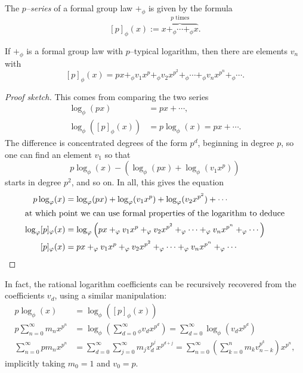 \begin{definition}
The \textit{$p$--series} of a formal group law $+_\phi$ is given by the formula \[[p]_\phi(x) := \overset{\text{$p$ times}}{\overbrace{x +_\phi \cdots +_\phi x}}.\]
\end{definition}

\begin{lemma}
If $+_\phi$ is a formal group law with $p$--typical logarithm, then there are elements $v_n$ with \[[p]_\phi(x) = px +_\phi v_1 x^p +_\phi v_2 x^{p^2} +_\phi \cdots +_\phi v_n x^{p^n} +_\phi \cdots.\]
\end{lemma}
\begin{proof}[Proof sketch]
This comes from comparing the two series
\begin{align*}
\log_\phi(px) & = px + \cdots, \\
\log_\phi([p]_\phi(x)) & = p \log_\phi(x) = px + \cdots.
\end{align*}
The difference is concentrated degrees of the form $p^d$, beginning in degree $p$, so one can find an element $v_1$ so that \[p \log_\phi(x) - (\log_\phi(px) + \log_\phi(v_1 x^p))\] starts in degree $p^2$, and so on.  In all, this gives the equation
\begin{align*}
p \log_\phi(x) & = \log_\phi (px) + \log_\phi(v_1 x^p) + \log_\phi(v_2 x^{p^2}) + \cdots \\
\intertext{at which point we can use formal properties of the logarithm to deduce}
\log_\phi [p]_\phi(x) & = \log_\phi \left(px +_\phi v_1 x^p +_\phi v_2 x^{p^2} +_\phi \cdots +_\phi v_n x^{p^n} +_\phi \cdots\right) \\
[p]_\phi(x) & = px +_\phi v_1 x^p +_\phi v_2 x^{p^2} +_\phi \cdots +_\phi v_n x^{p^n} +_\phi \cdots \qedhere
\end{align*}
\end{proof}

\begin{remark}
In fact, the rational logarithm coefficients can be recursively recovered from the coefficients $v_d$, using a similar manipulation:
\begin{align*}
p \log_\phi(x) & = \log_\phi\left([p]_\phi(x)\right) \\
p \sum_{n=0}^\infty m_n x^{p^n} & = \log_\phi \left(\sum_{d=0}^\infty{}_\phi v_d x^{p^d} \right) = \sum_{d=0}^\infty \log_\phi\left(v_d x^{p^d}\right) \\
\sum_{n=0}^\infty p m_n x^{p^n} & = \sum_{d=0}^\infty \sum_{j=0}^\infty m_j v_d^{p^j} x^{p^{d+j}} = \sum_{n=0}^\infty \left( \sum_{k=0}^n m_k v_{n-k}^{p^k} \right) x^{p^n},
\end{align*}
implicitly taking $m_0 = 1$ and $v_0 = p$.
\end{remark}

